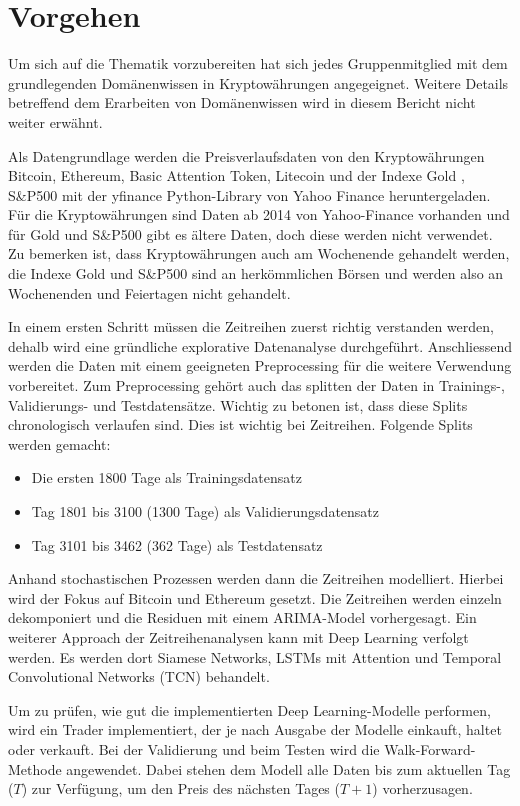 \section{Vorgehen}

Um sich auf die Thematik vorzubereiten hat sich jedes Gruppenmitglied mit dem grundlegenden Domänenwissen in Kryptowährungen angegeignet. Weitere Details betreffend dem Erarbeiten von Domänenwissen wird in diesem Bericht nicht weiter erwähnt.

Als Datengrundlage werden die Preisverlaufsdaten von den Kryptowährungen Bitcoin, Ethereum, Basic Attention Token, Litecoin und der Indexe Gold \parencite{yf2024gld}, S\&P500 \parencite{yf2024sp500} mit der yfinance Python-Library von Yahoo Finance heruntergeladen. Für die Kryptowährungen sind Daten ab 2014 von  Yahoo-Finance vorhanden und für Gold und S\&P500 gibt es ältere Daten, doch diese werden nicht verwendet. Zu bemerken ist, dass Kryptowährungen auch am Wochenende gehandelt werden, die Indexe Gold und S\&P500 sind an herkömmlichen Börsen und werden also an Wochenenden und Feiertagen nicht gehandelt.

In einem ersten Schritt müssen die Zeitreihen zuerst richtig verstanden werden, dehalb wird eine gründliche explorative Datenanalyse durchgeführt. Anschliessend werden die Daten mit einem geeigneten Preprocessing für die weitere Verwendung vorbereitet.
Zum Preprocessing gehört auch das splitten der Daten in Trainings-, Validierungs- und Testdatensätze. Wichtig zu betonen ist, dass diese Splits chronologisch verlaufen sind. Dies ist wichtig bei Zeitreihen. Folgende Splits werden gemacht:

\begin{itemize}
    \item Die ersten 1800 Tage als Trainingsdatensatz
    \item Tag 1801 bis 3100 (1300 Tage) als Validierungsdatensatz
    \item Tag 3101 bis 3462 (362 Tage) als Testdatensatz
\end{itemize}

Anhand stochastischen Prozessen werden dann die Zeitreihen modelliert. Hierbei wird der Fokus auf Bitcoin und Ethereum gesetzt. Die Zeitreihen werden einzeln dekomponiert und die Residuen mit einem ARIMA-Model vorhergesagt. Ein weiterer Approach der Zeitreihenanalysen kann mit Deep Learning verfolgt werden. Es werden dort Siamese Networks, LSTMs mit Attention und Temporal Convolutional Networks (TCN) behandelt.

Um zu prüfen, wie gut die implementierten Deep Learning-Modelle performen, wird ein Trader implementiert, der je nach Ausgabe der Modelle einkauft, haltet oder verkauft. Bei der Validierung und beim Testen wird die Walk-Forward-Methode angewendet. Dabei stehen dem Modell alle Daten bis zum aktuellen Tag ($T$) zur Verfügung, um den Preis des nächsten Tages ($T+1$) vorherzusagen. \parencite{Gray2018}
